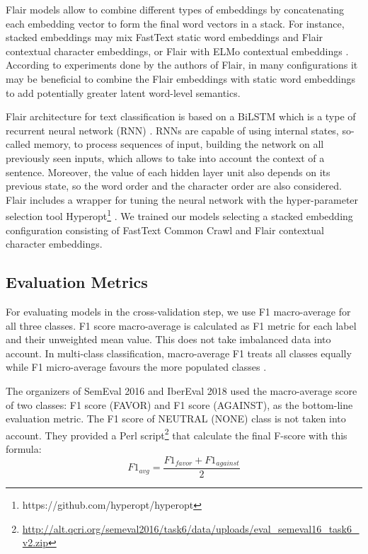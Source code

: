 \documentclass[10pt, a4paper]{article}
\begin{document}
Flair models allow to combine different types of embeddings by concatenating each embedding vector to form the final word vectors in a stack. For instance, stacked embeddings may mix FastText static word embeddings and Flair contextual character embeddings, or Flair with ELMo contextual embeddings \cite{Peters2018}. According to experiments done by the authors of Flair, in many configurations it may be beneficial to combine the Flair embeddings with static word embeddings to add potentially greater latent word-level semantics.

Flair architecture for text classification is based on a BiLSTM which is a type of recurrent neural network (RNN) \cite{Schuster97}. RNNs are capable of using internal states, so-called memory, to process sequences of input, building the network on all previously seen inputs, which allows to take into account the context of a sentence. Moreover, the value of each hidden layer unit also depends on its previous state, so the word order and the character order are also considered. Flair includes a wrapper for tuning the neural network with the hyper-parameter selection tool Hyperopt\footnote{https://github.com/hyperopt/hyperopt} \cite{Bergstra:2013:MSM:3042817.3042832}. We trained our models selecting a stacked embedding configuration consisting of FastText Common Crawl and Flair contextual character embeddings.

\subsection{Evaluation Metrics}

For evaluating models in the cross-validation step, we use F1 macro-average for all three classes. F1 score macro-average is calculated as F1 metric for each label and their unweighted mean value. This does not take imbalanced data into account. In multi-class classification, macro-average F1 treats all classes equally while F1 micro-average favours the more populated classes \cite{Sokolova:2009}.

The organizers of SemEval 2016 and IberEval 2018 used the macro-average score of two classes: F1 score (FAVOR) and F1 score (AGAINST), as the bottom-line evaluation metric. The F1 score of NEUTRAL (NONE) class is not taken into account. They provided a Perl script\footnote{\url{http://alt.qcri.org/semeval2016/task6/data/uploads/eval_semeval16_task6_v2.zip}} that calculate the final F-score with this formula: 
\[F1_{avg} = \frac{F1_{favor} + F1_{against}}{2}\]
\end{document}
